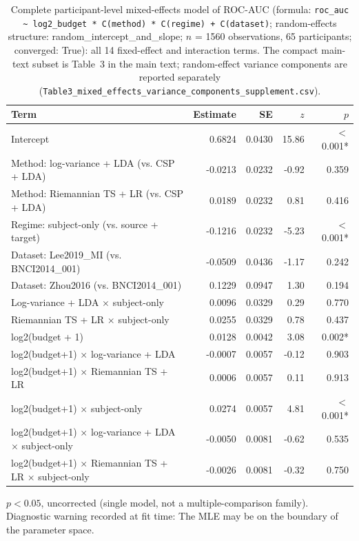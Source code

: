 \begin{table}[t]
\centering
\small
\begin{threeparttable}
\caption{Complete participant-level mixed-effects model of ROC-AUC (formula: \texttt{roc\_auc \textasciitilde{} log2\_budget * C(method) * C(regime) + C(dataset)}; random-effects structure: random\_intercept\_and\_slope; $n$ = 1560 observations, 65 participants; converged: True): all 14 fixed-effect and interaction terms. The compact main-text subset is Table~3 in the main text; random-effect variance components are reported separately (\texttt{Table3\_mixed\_effects\_variance\_components\_supplement.csv}).}
\label{tab:mixed_effects_full}
\begin{tabular}{lrrrr}
\toprule
Term & Estimate & SE & $z$ & $p$ \\
\midrule
Intercept & 0.6824 & 0.0430 & 15.86 & $<$0.001* \\
Method: log-variance + LDA (vs. CSP + LDA) & -0.0213 & 0.0232 & -0.92 & 0.359 \\
Method: Riemannian TS + LR (vs. CSP + LDA) & 0.0189 & 0.0232 & 0.81 & 0.416 \\
Regime: subject-only (vs. source + target) & -0.1216 & 0.0232 & -5.23 & $<$0.001* \\
Dataset: Lee2019\_MI (vs. BNCI2014\_001) & -0.0509 & 0.0436 & -1.17 & 0.242 \\
Dataset: Zhou2016 (vs. BNCI2014\_001) & 0.1229 & 0.0947 & 1.30 & 0.194 \\
Log-variance + LDA $\times$ subject-only & 0.0096 & 0.0329 & 0.29 & 0.770 \\
Riemannian TS + LR $\times$ subject-only & 0.0255 & 0.0329 & 0.78 & 0.437 \\
log2(budget + 1) & 0.0128 & 0.0042 & 3.08 & 0.002* \\
log2(budget+1) $\times$ log-variance + LDA & -0.0007 & 0.0057 & -0.12 & 0.903 \\
log2(budget+1) $\times$ Riemannian TS + LR & 0.0006 & 0.0057 & 0.11 & 0.913 \\
log2(budget+1) $\times$ subject-only & 0.0274 & 0.0057 & 4.81 & $<$0.001* \\
log2(budget+1) $\times$ log-variance + LDA $\times$ subject-only & -0.0050 & 0.0081 & -0.62 & 0.535 \\
log2(budget+1) $\times$ Riemannian TS + LR $\times$ subject-only & -0.0026 & 0.0081 & -0.32 & 0.750 \\
\bottomrule
\end{tabular}
\begin{tablenotes}
\footnotesize
\item[*] $p < 0.05$, uncorrected (single model, not a multiple-comparison family). Diagnostic warning recorded at fit time: The MLE may be on the boundary of the parameter space.
\end{tablenotes}
\end{threeparttable}
\end{table}
